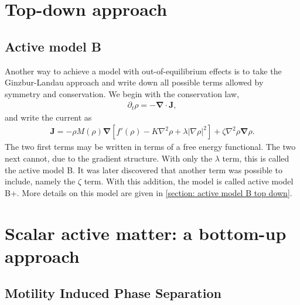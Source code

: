 \section{Top-down approach}

\subsection{Active model B}

Another way to achieve a model with out-of-equilibrium effects is to take the Ginzbur-Landau approach and write down all possible terms allowed by symmetry and conservation.
We begin with the conservation law,
%
\begin{align}
    \partial_t \rho = - \bm \nabla \cdot \bm J,
\end{align}
%
and write the current as
%
\begin{align}
    \bm J = 
    - \rho M(\rho) \bm \nabla 
    \left[
        f'(\rho) - K \nabla^2 \rho + \lambda |\nabla \rho|^2
    \right]
    + \zeta \nabla^2 \rho \bm \nabla \rho.
\end{align}
%
The two first terms may be written in terms of a free energy functional.
The two next cannot, due to the gradient structure.
With only the $\lambda$ term, this is called the active model B.
It was later discovered that another term was possible to include, namely the $\zeta$ term.
With this addition, the model is called active model B+.
More details on this model are given in \autoref{section: active model B top down}.






\section{Scalar active matter: a bottom-up approach}



\subsection{Motility Induced Phase Separation}


